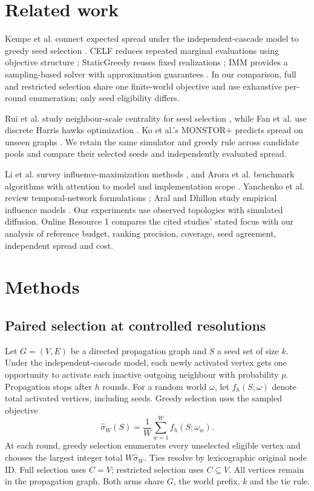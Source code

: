 \documentclass[smallextended]{svjour3}
\begin{document}
\section{Related work}
Kempe et al. connect expected spread under the independent-cascade model to greedy seed selection \cite{ref1}. CELF reduces repeated marginal evaluations using objective structure \cite{ref7}; StaticGreedy reuses fixed realizations \cite{ref8}; IMM provides a sampling-based solver with approximation guarantees \cite{ref2}. In our comparison, full and restricted selection share one finite-world objective and use exhaustive per-round enumeration; only seed eligibility differs.

Rui et al. study neighbour-scale centrality for seed selection \cite{ref12}, while Fan et al. use discrete Harris hawks optimization \cite{ref13}. Ko et al.'s MONSTOR+ predicts spread on unseen graphs \cite{ref19}. We retain the same simulator and greedy rule across candidate pools and compare their selected seeds and independently evaluated spread.

Li et al. survey influence-maximization methods \cite{ref9}, and Arora et al. benchmark algorithms with attention to model and implementation scope \cite{ref16}. Yanchenko et al. review temporal-network formulations \cite{ref11}; Aral and Dhillon study empirical influence models \cite{ref15}. Our experiments use observed topologies with simulated diffusion. Online Resource 1 compares the cited studies' stated focus with our analysis of reference budget, ranking precision, coverage, seed agreement, independent spread and cost.

\section{Methods}
\subsection{Paired selection at controlled resolutions}
Let $G=(V,E)$ be a directed propagation graph and $S$ a seed set of size $k$. Under the independent-cascade model, each newly activated vertex gets one opportunity to activate each inactive outgoing neighbour with probability $p$. Propagation stops after $h$ rounds. For a random world $\omega$, let $f_h(S;\omega)$ denote total activated vertices, including seeds. Greedy selection uses the sampled objective
\begin{equation}
\widehat\sigma_W(S)=\frac{1}{W}\sum_{w=1}^{W}f_h(S;\omega_w).
\end{equation}
At each round, greedy selection enumerates every unselected eligible vertex and chooses the largest integer total $W\widehat\sigma_W$. Ties resolve by lexicographic original node ID. Full selection uses $C=V$; restricted selection uses $C\subseteq V$. All vertices remain in the propagation graph. Both arms share $G$, the world prefix, $k$ and the tie rule.
\end{document}
